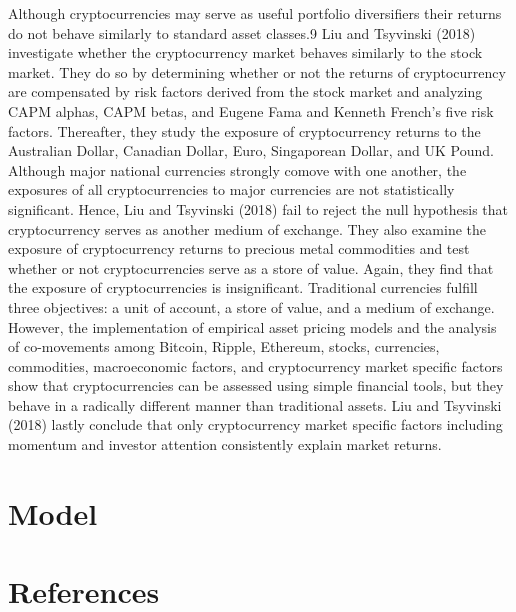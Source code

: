 \documentclass[]{article}
\begin{document}
Although cryptocurrencies may serve as useful portfolio diversifiers
their returns do not behave similarly to standard asset classes.9 Liu
and Tsyvinski (2018) investigate whether the cryptocurrency market
behaves similarly to the stock market. They do so by determining whether
or not the returns of cryptocurrency are compensated by risk factors
derived from the stock market and analyzing CAPM alphas, CAPM betas, and
Eugene Fama and Kenneth French's five risk factors. Thereafter, they
study the exposure of cryptocurrency returns to the Australian Dollar,
Canadian Dollar, Euro, Singaporean Dollar, and UK Pound. Although major
national currencies strongly comove with one another, the exposures of
all cryptocurrencies to major currencies are not statistically
significant. Hence, Liu and Tsyvinski (2018) fail to reject the null
hypothesis that cryptocurrency serves as another medium of exchange.
They also examine the exposure of cryptocurrency returns to precious
metal commodities and test whether or not cryptocurrencies serve as a
store of value. Again, they find that the exposure of cryptocurrencies
is insignificant. Traditional currencies fulfill three objectives: a
unit of account, a store of value, and a medium of exchange. However,
the implementation of empirical asset pricing models and the analysis of
co-movements among Bitcoin, Ripple, Ethereum, stocks, currencies,
commodities, macroeconomic factors, and cryptocurrency market specific
factors show that cryptocurrencies can be assessed using simple
financial tools, but they behave in a radically different manner than
traditional assets. Liu and Tsyvinski (2018) lastly conclude that only
cryptocurrency market specific factors including momentum and investor
attention consistently explain market returns.

\section{Model}\label{model}

\section{References}\label{references}
\end{document}
